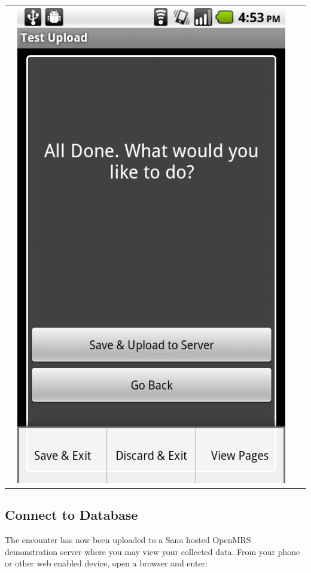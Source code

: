 \documentclass[a4paper,10pt]{article}
\begin{document}
\begin{flushleft}
\begin{tabular}{ c c c c }
&\includegraphics[scale=0.15,keepaspectratio=true]{client_proc_menu.png}
\end{tabular}
\end{flushleft}
\newpage

\subsection{Connect to Database}
The encounter has now been uploaded to a Sana hosted OpenMRS demonstration 
server where you may view your collected data. From your phone or other web 
enabled device, open a browser and enter:
\end{document}
